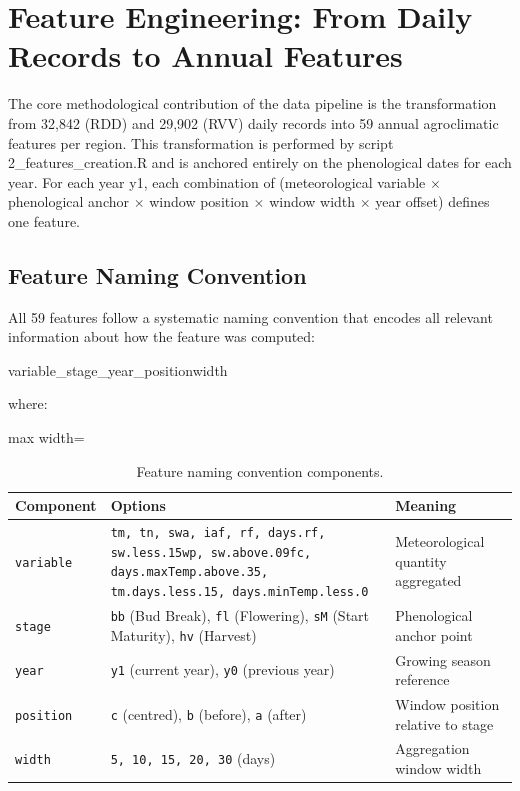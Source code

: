 \section{Feature Engineering: From Daily Records to Annual Features}\label{sec:feature_engineering_from_daily}

The core methodological contribution of the data pipeline is the transformation from 32,842 (RDD) and 29,902 (RVV) daily records into 59 annual agroclimatic features per region. This transformation is performed by script 2\_features\_creation.R and is anchored entirely on the phenological dates for each year. For each year y1, each combination of (meteorological variable $\times$ phenological anchor $\times$ window position $\times$ window width $\times$ year offset) defines one feature.


\subsection{Feature Naming Convention}\label{sub:feature_naming_convention}

All 59 features follow a systematic naming convention that encodes all relevant information about how the feature was computed:

{variable}\_{stage}\_{year}\_{position}{width}

where:

\begin{table}[htbp]
  \centering
  \caption{Feature naming convention components.}\label{tab:ch3d_4}
  \small
  \begin{adjustbox}{max width=\textwidth}
    \begin{tabularx}{\textwidth}{p{1.8cm}|X|p{4.5cm}}
  \toprule
  \textbf{Component} & \textbf{Options} & \textbf{Meaning} \\
  \midrule
  \texttt{variable} & \texttt{tm, tn, swa, iaf, rf, days.rf, sw.less.15wp, sw.above.09fc, days.maxTemp.above.35, tm.days.less.15, days.minTemp.less.0} & Meteorological quantity aggregated \\[4pt]
  \texttt{stage} & \texttt{bb} (Bud Break), \texttt{fl} (Flowering), \texttt{sM} (Start Maturity), \texttt{hv} (Harvest) & Phenological anchor point \\[4pt]
  \texttt{year} & \texttt{y1} (current year), \texttt{y0} (previous year) & Growing season reference \\[4pt]
  \texttt{position} & \texttt{c} (centred), \texttt{b} (before), \texttt{a} (after) & Window position relative to stage \\[4pt]
  \texttt{width} & \texttt{5, 10, 15, 20, 30} (days) & Aggregation window width \\
  \bottomrule
\end{tabularx}
  \end{adjustbox}

\end{table}



